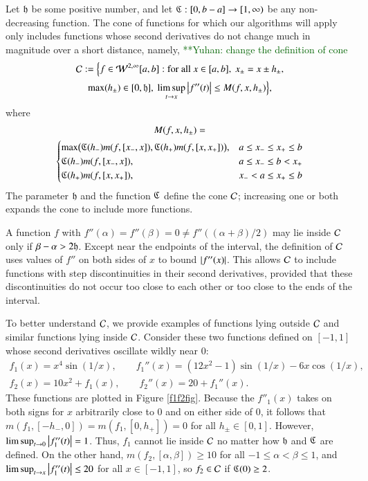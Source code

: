 \documentclass[review]{elsarticle}
\makeatletter
\newcommand{\Vast}{\bBigg@{6}}
\theoremstyle{definition}
\newcommand{\Vastr}{\mathclose\Vast}
\newcommand{\yuhannote}[1]{  {\textcolor{darkgreen}  {\mbox{**Yuhan:} #1}}}
\makeatother
\begin{document}
Let $\mathfrak{h}$ be some positive number, and let $\mathfrak{C} : [0,b-a] \to [1,\infty)$ be any
non-decreasing function. The cone of functions for which our algorithms will
apply only includes functions whose second derivatives do not change much in
magnitude over a short distance, namely,\yuhannote{change the definition of cone}
\begin{multline} \label{conedef}
\nonumber \mathcal{C} :=   \Bigl \{
 f  \in    \mathcal{W}^{2,\infty}[a,b]:    \text{for all } x \in [a,b], \ x_\pm = x \pm h_\pm,
\\  \max(h_{\pm}) \in [0, \mathfrak{h}], \  \limsup_{t \to x}\left \lvert f''(t) \right \rvert  \le M(f,x,h_\pm) \Bigr \},
\end{multline}
where
\begin{multline*}
M(f,x,h_\pm)=\\
\begin{cases}
  \max\bigl(\fC(h_{-}) m(f,[x_-,x]),\fC(h_{+}) m(f,[x,x_+])\bigr), & a \le x_- \le x_+ \le b\\
\fC(h_{-}) m(f,[x_-,x]), & a \le x_- \le b <  x_+\\
\fC(h_{+}) m(f,[x,x_+]), & x_- < a \le x_+ \le b
\end{cases} %
\end{multline*}
The parameter $\mathfrak{h}$ and the function $\mathfrak{C}$ define the cone $\mathcal{C}$; increasing
one or both expands the cone to include more functions.

A function $f$ with $f''(\alpha) = f''(\beta) = 0 \ne f''((\alpha+\beta)/2)$ may
lie inside $\mathcal{C}$ only if $\beta - \alpha > 2\mathfrak{h}$. Except near the endpoints of
the interval, the definition of $\mathcal{C}$ uses values of $f''$ on both sides of $x$
to bound $\left \lvert f''(x) \right \rvert$. This allows $\mathcal{C}$ to include functions with step
discontinuities in their second derivatives, provided that these discontinuities
do not occur too close to each other or too close to the ends of the interval.

To better understand $\mathcal{C}$, we provide examples of functions lying outside $\mathcal{C}$
and similar functions lying inside $\mathcal{C}$. Consider these two functions defined
on $[-1,1]$ whose second derivatives oscillate wildly near $0$:
\begin{gather*}
f_1(x) = x^4 \sin(1/x), \qquad f_1''(x) = (12x^2 - 1) \sin(1/x) -6 x \cos(1/x), \\
f_2(x) = 10  x^2 + f_1(x), \qquad f_2''(x) = 20+ f_1''(x).
\end{gather*}
These functions are plotted in Figure \ref{f1f2fig}. Because the $f''_1(x)$
takes on both signs for $x$ arbitrarily close to $0$ and on either side of $0$,
it follows that $m(f_1,[-h_-,0]) = m(f_1,[0,h_+]) = 0$ for all $h_\pm \in [0,1]$.
However, $\limsup_{t \to 0} \left \lvert f''_1(t) \right \rvert = 1$. Thus, $f_1$ cannot lie inside
$\mathcal{C}$ no matter how $\mathfrak{h}$ and $\mathfrak{C}$ are defined. On the other hand,
$m(f_2,[\alpha, \beta]) \ge 10$ for all $-1 \le \alpha < \beta \le 1$, and
$\limsup_{t \to x} \left \lvert f''_1(t) \right \rvert \le 20$ for all $x \in [-1,1]$, so $f_2 \in
\mathcal{C}$ if $\mathfrak{C}(0) \ge 2$.
\end{document}

